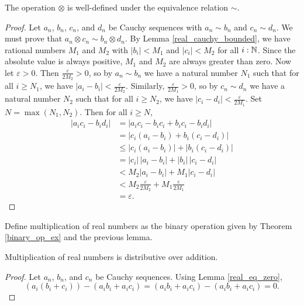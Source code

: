 \documentclass[../../math.tex]{subfiles}
\begin{document}
\begin{lemma}
    The operation $\otimes$ is well-defined under the equivalence relation
    $\sim$.
\end{lemma}
\begin{proof}
    Let $a_n$, $b_n$, $c_n$, and $d_n$ be Cauchy sequences with $a_n \sim b_n$
    and $c_n \sim d_n$.  We must prove that $a_n \otimes c_n \sim b_n \otimes
    d_n$.  By Lemma \ref{real_cauchy_bounded}, we have rational numbers $M_1$
    and $M_2$ with $|b_i| < M_1$ and $|c_i| < M_2$ for all $i : \mathbb{N}$.  Since the
    absolute value is always positive, $M_1$ and $M_2$ are always greater than
    zero.  Now let $\varepsilon > 0$.  Then $\frac{\varepsilon}{2M_2} > 0$, so
    by $a_n \sim b_n$ we have a natural number $N_1$ such that for all $i \geq
    N_1$, we have $|a_i - b_i| < \frac{\varepsilon}{2M_2}$.  Similarly,
    $\frac{\varepsilon}{2M_1} > 0$, so by $c_n \sim d_n$ we have a natural
    number $N_2$ such that for all $i \geq N_2$, we have $|c_i - d_i| <
    \frac{\varepsilon}{2M_1}$.  Set $N = \max(N_1, N_2)$.  Then for all $i \geq
    N$,
    \begin{align*}
        |a_i c_i - b_i d_i|
        &= |a_i c_i - b_i c_i + b_i c_i - b_i d_i| \\
        &= |c_i (a_i - b_i) + b_i (c_i - d_i)| \\
        &\leq |c_i (a_i - b_i)| + |b_i (c_i - d_i)| \\
        &= |c_i|\, |a_i - b_i| + |b_i|\, |c_i - d_i| \\
        &< M_2 |a_i - b_i| + M_1 |c_i - d_i| \\
        &< M_2 \frac{\varepsilon}{2M_2} + M_1 \frac{\varepsilon}{2M_1} \\
        &= \varepsilon.
    \end{align*}
\end{proof}

\begin{instance}
    Define multiplication of real numbers as the binary operation given by
    Theorem \ref{binary_op_ex} and the previous lemma.
\end{instance}

\begin{instance}
    Multiplication of real numbers is distributive over addition.
\end{instance}
\begin{proof}
    Let $a_n$, $b_n$, and $c_n$ be Cauchy sequences.  Using Lemma
    \ref{real_eq_zero},
    \[
        (a_i(b_i + c_i)) - (a_ib_i + a_ic_i)
        = (a_ib_i + a_ic_i) - (a_ib_i + a_ic_i)
        = 0.
    \]
\end{proof}
\end{document}
